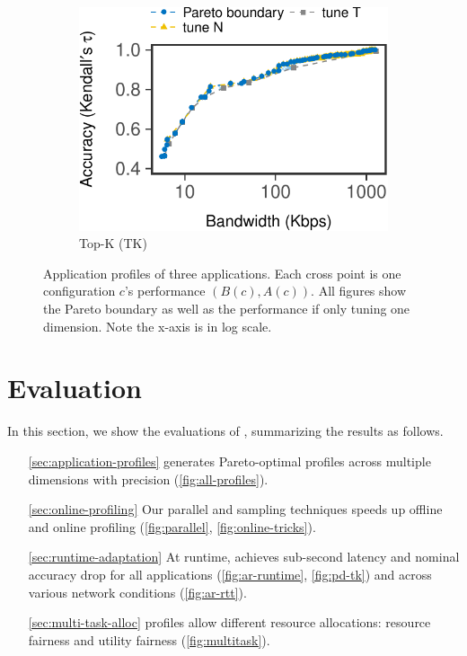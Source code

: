 \begin{figure}[htb]
\begin{subfigure}[t]{0.32\textwidth}
    \includegraphics[width=\textwidth]{figures/profile-topk.pdf}
    \caption{Top-K (TK)}
    \label{fig:tk-profile}
  \end{subfigure}
  \caption{Application profiles of three applications. Each cross point is one
    configuration $c$'s performance $(B(c), A(c))$. All figures show the Pareto
    boundary as well as the performance if only tuning one dimension. Note the
    x-axis is in log scale.}
  \label{fig:all-profiles}
\end{figure}

\section{Evaluation}
\label{sec:evaluation}

In this section, we show the evaluations of \sysname{}, summarizing the results
as follows.

\begin{itemize}[itemsep=0pt, topsep=3pt]
\item[\autoref{sec:application-profiles}] \sysname{} generates Pareto-optimal
  profiles across multiple dimensions with precision
  (\autoref{fig:all-profiles}).
\item[\autoref{sec:online-profiling}] Our parallel and sampling techniques
  speeds up offline and online profiling (\autoref{fig:parallel},
  \autoref{fig:online-tricks}).
\item[\autoref{sec:runtime-adaptation}] At runtime, \sysname{} achieves
  sub-second latency and nominal accuracy drop for all applications
  (\autoref{fig:ar-runtime}, \autoref{fig:pd-tk}) and across various network
  conditions (\autoref{fig:ar-rtt}).
\item[\autoref{sec:multi-task-alloc}] \sysname{} profiles allow different
  resource allocations: resource fairness and utility fairness
  (\autoref{fig:multitask}).
\end{itemize}


